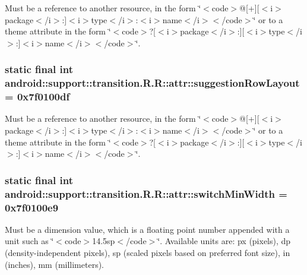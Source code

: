 Must be a reference to another resource, in the form \char`\"{}$<$code$>$@\mbox{[}+\mbox{]}\mbox{[}$<$i$>$package$<$/i$>$:\mbox{]}$<$i$>$type$<$/i$>$:$<$i$>$name$<$/i$>$$<$/code$>$\char`\"{} or to a theme attribute in the form \char`\"{}$<$code$>$?\mbox{[}$<$i$>$package$<$/i$>$:\mbox{]}\mbox{[}$<$i$>$type$<$/i$>$:\mbox{]}$<$i$>$name$<$/i$>$$<$/code$>$\char`\"{}. \hypertarget{classandroid_1_1support_1_1transition_1_1_r_1_1attr_820c4ccbfae46e5d37ee011cea869f48}{
\subsubsection[{suggestionRowLayout}]{\setlength{\rightskip}{0pt plus 5cm}static final int android::support::transition.R.R::attr::suggestionRowLayout = 0x7f0100df}}
\label{classandroid_1_1support_1_1transition_1_1_r_1_1attr_820c4ccbfae46e5d37ee011cea869f48}


Must be a reference to another resource, in the form \char`\"{}$<$code$>$@\mbox{[}+\mbox{]}\mbox{[}$<$i$>$package$<$/i$>$:\mbox{]}$<$i$>$type$<$/i$>$:$<$i$>$name$<$/i$>$$<$/code$>$\char`\"{} or to a theme attribute in the form \char`\"{}$<$code$>$?\mbox{[}$<$i$>$package$<$/i$>$:\mbox{]}\mbox{[}$<$i$>$type$<$/i$>$:\mbox{]}$<$i$>$name$<$/i$>$$<$/code$>$\char`\"{}. \hypertarget{classandroid_1_1support_1_1transition_1_1_r_1_1attr_51fba62e319bc4e093cd2abe36b4ab1d}{
\subsubsection[{switchMinWidth}]{\setlength{\rightskip}{0pt plus 5cm}static final int android::support::transition.R.R::attr::switchMinWidth = 0x7f0100e9}}
\label{classandroid_1_1support_1_1transition_1_1_r_1_1attr_51fba62e319bc4e093cd2abe36b4ab1d}


Must be a dimension value, which is a floating point number appended with a unit such as \char`\"{}$<$code$>$14.5sp$<$/code$>$\char`\"{}. Available units are: px (pixels), dp (density-independent pixels), sp (scaled pixels based on preferred font size), in (inches), mm (millimeters). 

